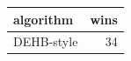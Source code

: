 \begin{tabular}{lr}
\toprule
algorithm & wins \\
\midrule
DEHB-style & 34 \\
\bottomrule
\end{tabular}
